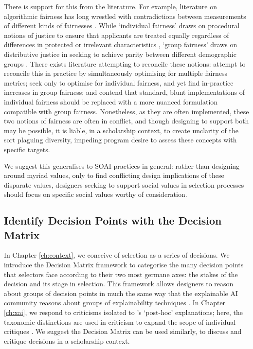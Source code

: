 There is support for this from the literature. For example, literature on algorithmic fairness has long wrestled with contradictions between measurements of different kinds of fairnesses \cite{pmlr-v80-kearns18a}. While `individual fairness' draws on procedural notions of justice to ensure that applicants are treated equally regardless of differences in protected or irrelevant characteristics \cite{dwork_fairness_2012}, `group fairness' draws on distributive justice in seeking to achieve parity between different demographic groups \cite{Citron_2008,Olsaretti_2018}. There exists literature attempting to reconcile these notions: \textcite{pmlr-v28-zemel13} attempt to reconcile this in practice by simultaneously optimising for multiple fairness metrics; \textcite{lahoti2019ifairlearningindividuallyfair} seek only to optimise for individual fairness, and yet find in-practice increases in group fairness; and \textcite{binns_apparent_2019} contend that standard, blunt implementations of individual fairness should be replaced with a more nuanced formulation compatible with group fairness. Nonetheless, as they are often implemented, these two notions of fairness are often in conflict, and though designing to support both may be possible, it is liable, in a scholarship context, to create unclarity of the sort plaguing diversity, impeding program desire to assess these concepts with specific targets. 

We suggest this generalises to SOAI practices in general: rather than designing around myriad values, only to find conflicting design implications of these disparate values, designers seeking to support social values in selection processes should focus on specific social values worthy of consideration.

\subsection{Identify Decision Points with the Decision Matrix}
In Chapter \ref{ch:context}, we conceive of selection as a series of decisions. We introduce the Decision Matrix framework to categorise the many decision points that selectors face according to their two most germane axes: the stakes of the decision and its stage in selection. This framework allows designers to reason about groups of decision points in much the same way that the explainable AI community reasons about groups of explainability techniques \cite{ford_play_2020,kumar_problems_2020,doshi-velez_towards_2017,friedrich_taxonomy_2011,molnar_interpretable_2019}. In Chapter \ref{ch:xai}, we respond to criticisms isolated to \textcite{friedrich_taxonomy_2011}'s `post-hoc' explanations; here, the taxonomic distinctions are used in criticism to expand the scope of individual critiques \cite{barocas_hidden_2020,kumar_problems_2020}. We suggest the Decision Matrix can be used similarly, to discuss and critique decisions in a scholarship context.

